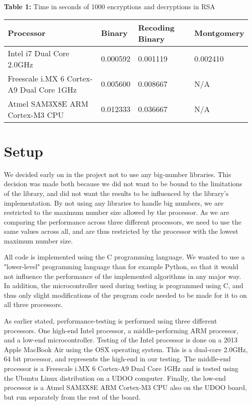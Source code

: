 \documentclass[twocolumn]{IEEEtran}
\begin{document}
\begin{table*}[!htb] 
\textbf{Table 1:} Time in seconds of 1000 encryptions and decryptions in RSA \\[1em]
    \centering
    \begin{tabular}{|l|l|l|l|}
    \hline
    {\bf Processor}                                 & {\bf Binary}   & {\bf Recoding Binary} & {\bf Montgomery} \\ \hline
    Intel i7 Dual Core 2.0GHz                 & 0.000592 & 0.001119        & 0.002410   \\ \hline
    Freescale i.MX 6 Cortex-A9 Dual Core 1GHz & 0.005600 & 0.008667        & N/A       \\ \hline
    Atmel SAM3X8E ARM Cortex-M3 CPU           & 0.012333 & 0.036667        & N/A       \\ \hline
    \end{tabular}
\end{table*}

\section{Setup}
We decided early on in the project not to use any big-number libraries. This decision was made both because we did not want to be bound to the limitations of the library, and did not want the results to be influenced by the library's implementation. By not using any libraries to handle big numbers, we are restricted to the maximum number size allowed by the processor. As we are comparing the performance across three different processors, we need to use the same values across all, and are thus restricted by the processor with the lowest maximum number size. 

All code is implemented using the C programming language.  We wanted to use a "lower-level" programming language than for example Python, so that it would not influence the performance of the implemented algorithms in any major way. In addition, the microcontroller used during testing is programmed using C, and thus only slight modifications of the program code needed to be made for it to on all three processors.

As earlier stated, performance-testing is performed using three different processors. One high-end Intel processor, a middle-performing ARM processor, and a low-end microcontroller. Testing of the Intel processor is done on a 2013 Apple MacBook Air using the OSX operating system. This is a dual-core 2.0GHz, 64 bit processor, and represents the high-end in our testing. The middle-end processor is a Freescale i.MX 6 Cortex-A9 Dual Core 1GHz and is tested using the Ubuntu Linux distribution on a UDOO computer. Finally, the low-end processor is a Atmel SAM3X8E ARM Cortex-M3 CPU also on the UDOO board, but run separately from the rest of the board.
\end{document}
